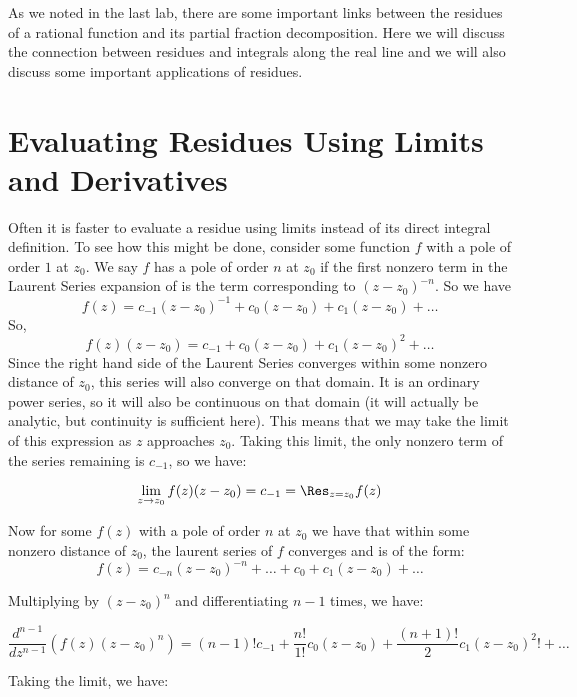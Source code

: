 

As we noted in the last lab, there are some important links between the residues of a rational function and its partial fraction decomposition. Here we will discuss the connection between residues and integrals along the real line and we will also discuss some important applications of residues.

\section*{Evaluating Residues Using Limits and Derivatives}
Often it is faster to evaluate a residue using limits instead of its direct integral definition. To see how this might be done, consider some function $f$ with a pole of order $1$ at $z_0$. We say $f$ has a pole of order $n$ at $z_0$ if the first nonzero term in the Laurent Series expansion of is the term corresponding to $(z-z_0)^{-n}$. So we have
$$f(z)=c_{-1}(z-z_0)^{-1}+c_0 (z-z_0) +c_1 (z-z_0) + \dots$$
So,
$$f(z)(z-z_0)=c_{-1}+c_0 (z-z_0) + c_1 (z-z_0)^2 + \dots$$
Since the right hand side of the Laurent Series converges within some nonzero distance of $z_0$, this series will also converge on that domain. It is an ordinary power series, so it will also be continuous on that domain (it will actually be analytic, but continuity is sufficient here). This means that we may take the limit of this expression as $z$ approaches $z_0$. Taking this limit, the only nonzero term of the series remaining is $c_{-1}$, so we have:

\begin{equation*}
\lim_{z\to z_0} f(z)(z-z_0) = c_{-1} = \Res_{z=z_0} f(z)
\end{equation*}

Now for some $f(z)$ with a pole of order $n$ at $z_0$ we have that within some nonzero distance of $z_0$, the laurent series of $f$ converges and is of the form:
$$f(z)=c_{-n}(z-z_0)^{-n}+\dots+c_0+c_1(z-z_0)+\dots$$

Multiplying by $(z-z_0)^{n}$ and differentiating $n-1$ times, we have:

$$\frac{d^{n-1}}{dz^{n-1}}(f(z)(z-z_0)^{n})=(n-1)! c_{-1} + \frac{n!}{1!} c_0 (z-z_0) + \frac{(n+1)!}{2} c_1 (z-z_0)^2!+\dots$$

Taking the limit, we have:

